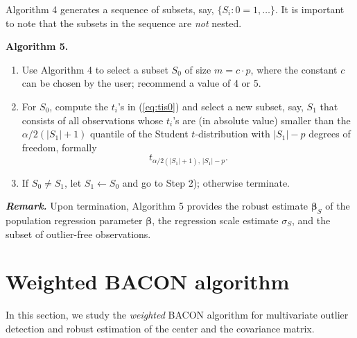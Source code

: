 \documentclass[a4paper,oneside,11pt,DIV=12]{scrartcl}
\begin{document}
Algorithm 4 generates a sequence of subsets, say, $\{S_i : 0=1, \ldots\}$.
It is important to note that the subsets in the sequence are
\textit{not} nested.

\vspace{1em}
\noindent \textbf{\sffamily Algorithm 5.}
\begin{enumerate}[Step 1)]
	\item Use Algorithm 4 to select a subset $S_0$ of size $m = c\cdot p$,
		where the constant $c$ can be chosen by the user;
		\citet{billor_hadi_etal_2000} recommend a value of 4 or 5.
	\item For $S_0$, compute the $t_i$'s in (\ref{eq:tis0}) and select
		a new subset, say, $S_1$ that consists of all observations whose
		$t_i$'s are (in absolute value) smaller than the
		$\alpha/2(\vert S_1 \vert +1)$ quantile of the Student
		$t$-distribution with $\vert S_1 \vert - p$ degrees of freedom,
		formally
		\begin{equation}\label{eq:tquantile}
			t_{\alpha/2(\vert S_1 \vert +1), \,\vert S_1 \vert - p}.
		\end{equation}
	\item If $S_0 \neq S_1$, let $S_1 \gets S_0$ and go to Step 2);
		otherwise terminate.
\end{enumerate}

\vspace{1em}
\noindent\textbf{\sffamily \small \itshape Remark.} Upon termination,
Algorithm 5 provides the robust estimate $\bm \beta_S$ of the population
regression parameter $\bm \beta$, the regression scale estimate $\sigma_S$,
and the subset of outlier-free observations.

\section{Weighted BACON algorithm}\label{sec:wbacon}
In this section, we study the \textit{weighted} BACON algorithm for
multivariate outlier detection and robust estimation of the center and
the covariance matrix.

\end{document}
